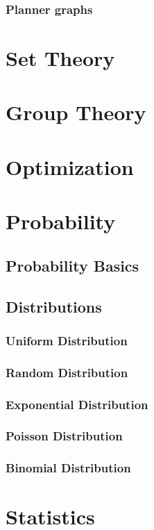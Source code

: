 \subsection{Planner graphs} 

\chapter{Set Theory}

\chapter{Group Theory}

\chapter{Optimization}

\chapter{Probability}
\section{Probability Basics}
\section{Distributions}
\subsection{Uniform Distribution}
\subsection{Random Distribution}
\subsection{Exponential Distribution}
\subsection{Poisson Distribution}
\subsection{Binomial Distribution}

\chapter{Statistics}